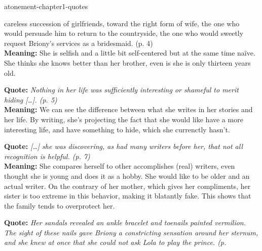 \documentclass[preview]{standalone}
\begin{document}
\begin{snippet}{atonement-chapter1-quotes}
\begin{minipage}[r]{0.95\textwidth}
{        careless succession of girlfriends, toward the right form
        of wife, the one who would persuade him to return to the
        countryside, the one who would sweetly request Briony's
        services as a bridesmaid. (p. 4)
    }
    \\
    \textbf{Meaning:} She is selfish and a little bit self-centered but at the same time naïve.
    She thinks she knows better than her brother, even is she is only thirteen years old.
\end{minipage}
\hr
\begin{minipage}[l]{0.05\textwidth}
\end{minipage}
\begin{minipage}[r]{0.95\textwidth}
    \textbf{Quote:} \textit{
        Nothing in her life was sufficiently interesting or
        shameful to merit hiding […]. (p. 5)
    }
    \\
    \textbf{Meaning:} We can see the difference between what she writes in her stories and her life.
    By writing, she's projecting the fact that she would like have a more interesting life,
    and have something to hide, which she currenctly hasn't.
\end{minipage}
\hr
\begin{minipage}[l]{0.05\textwidth}
\end{minipage}
\begin{minipage}[r]{0.95\textwidth}
    \textbf{Quote:} \textit{
        […] she was discovering, as had many writers before her,
        that not all recognition is helpful. (p. 7)
    }
    \\
    \textbf{Meaning:} She compares herself to other accomplishes (real) writers, even thought she is
    young and does it as a hobby. She would like to be older and an actual writer.
    On the contrary of her mother, which gives her compliments, her sister is too extreme
    in this behavior, making it blatantly fake.
    This shows that the family tends to overprotect her.
\end{minipage}
\hr
\begin{minipage}[l]{0.05\textwidth}
\end{minipage}
\begin{minipage}[r]{0.95\textwidth}
    \textbf{Quote:} \textit{
        Her sandals revealed an ankle bracelet and toenails
        painted vermilion. The sight of these nails gave Briony a
        constricting sensation around her sternum, and she knew
        at once that she could not ask Lola to play the prince. (p.
}
\end{minipage}
\end{snippet}
\end{document}
